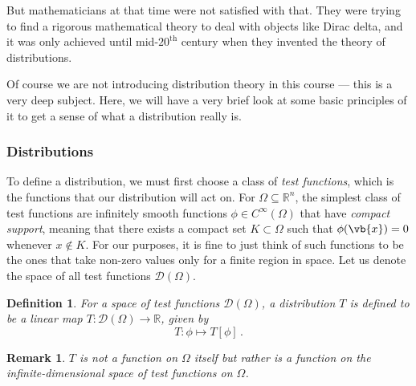 \documentclass{article}
\theoremstyle{plain}\theoremheaderfont{\normalfont\itshape}\theorembodyfont{\rmfamily}\theoremseparator{.}\newtheorem*{rem}{Remark}\newtheorem*{ex}{Example}\newtheorem*{proof}{Proof}\newtheorem*{altp}{Alternative proof}
\theoremstyle{plain}\theoremheaderfont{\normalfont\bfseries}\theorembodyfont{\rmfamily}\theoremseparator{.}\newtheorem{thm}{Theorem}[section]\newtheorem{lem}[thm]{Lemma}\newtheorem{prop}[thm]{Proposition}\newtheorem*{cor}{Corollary}\newtheorem{defn}[thm]{Definition}\newtheorem{clm}[thm]{Claim}\newtheorem{clminproof}{Claim}
\theoremstyle{break}\theoremheaderfont{\normalfont\itshape}\theorembodyfont{\rmfamily}\theoremseparator{.\medskip}\newtheorem*{proofskip}{Proof}\newtheorem*{exs}{Examples}\newtheorem*{rems}{Remarks}
\theoremstyle{break}\theoremheaderfont{\normalfont\bfseries}\theorembodyfont{\rmfamily}\theoremseparator{.\medskip}\newtheorem{lemskip}[thm]{Lemma}\newtheorem{defnskip}[thm]{Definition}\newtheorem{propskip}[thm]{Proposition}\newtheorem{thmskip}[thm]{Theorem}
\numberwithin{equation}{section}
\begin{document}
	But mathematicians at that time were not satisfied with that. They were trying to find a rigorous mathematical theory to deal with objects like Dirac delta, and it was only achieved until mid-\(20^{\text{th}}\) century when they invented the theory of distributions.

	Of course we are not introducing distribution theory in this course --- this is a very deep subject. Here, we will have a very brief look at some basic principles of it to get a sense of what a distribution really is.
	\subsubsection{Distributions}
	To define a distribution, we must first choose a class of \textit{test functions}, which is the functions that our distribution will act on. For \(\Omega\subseteq\mathbb{R}^n\), the simplest class of test functions are infinitely smooth functions \(\phi\in C^\infty(\Omega)\) that have \textit{compact support}, meaning that there exists a compact set \(K\subset\Omega\) such that \(\phi(\vb{x})=0\) whenever \(x\notin K\). For our purposes, it is fine to just think of such functions to be the ones that take non-zero values only for a finite region in space. Let us denote the space of all test functions \(\mathcal{D}(\Omega)\).
	\begin{defn}
		For a space of test functions \(\mathcal{D}(\Omega)\), a \textit{distribution} \(T\) is defined to be a linear map \(T:\mathcal{D}(\Omega)\to\mathbb{R}\), given by
		\[T:\phi\mapsto T[\phi]\,.\]
	\end{defn}
	\begin{rem}
		\(T\) is not a function on \(\Omega\) itself but rather is a function on the infinite-dimensional space of test functions on \(\Omega\).
	\end{rem}
\end{document}
